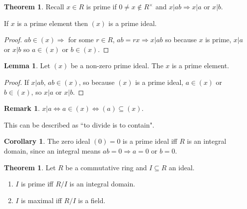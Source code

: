 \documentclass[12pt,a4paper]{article}
\theoremstyle{definition}
\newtheorem{theorem}[definition]{Theorem}
\newtheorem{corollary}[definition]{Corollary}
\newtheorem{lemma}[definition]{Lemma}
\newtheorem*{remark}{Remark}
\begin{document}
\begin{theorem}
	Recall $x \in R$ is prime if $0 \ne x \notin R^{\times}$ and $x | ab \Rightarrow x | a$ or $x | b$.

	If $x$ is a prime element then $(x)$ is a prime ideal.
\end{theorem}

\begin{proof}
	$ab \in (x) \Rightarrow$ for some $r \in R$, $ab = rx \Rightarrow x | ab$ so because $x$ is prime, $x | a$ or $x | b$ so $a \in (x)$ or $b \in (x)$.
\end{proof}

\begin{lemma}
	Let $(x)$ be a non-zero prime ideal. The $x$ is a prime element.
\end{lemma}

\begin{proof}
	If $x | ab$, $ab \in (x)$, so because $(x)$ is a prime ideal, $a \in (x)$ or $b \in (x)$, so $x | a$ or $x | b$.
\end{proof}

\begin{remark}
	$x | a \Leftrightarrow a \in (x) \Leftrightarrow (a) \subseteq (x)$.

	This can be described as ``to divide is to contain".
\end{remark}

\begin{corollary}
	The zero ideal $(0) = 0$ is a prime ideal iff $R$ is an integral domain, since an integral means $ab = 0 \Rightarrow a = 0 \text{ or } b = 0$.
\end{corollary}

\begin{theorem}
	Let $R$ be a commutative ring and $I \subseteq R$ an ideal.

	\begin{enumerate}
		\item $I$ is prime iff $R / I$ is an integral domain.
		\item $I$ is maximal iff $R / I$ is a field.
	\end{enumerate}
\end{theorem}
\end{document}
